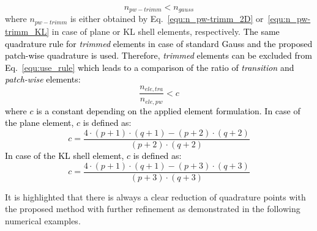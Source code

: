 \documentclass[3p]{elsarticle}
\newcommand{\reviewed}{\textcolor{black}}	%
\begin{document}
\begin{equation}\label{equ:use_rule}
	n_{pw-trimm} < n_{gauss}
\end{equation}
where $n_{pw-trimm}$ is either obtained by Eq.~\eqref{equ:n_pw-trimm_2D} or~\eqref{equ:n_pw-trimm_KL} in case of plane or KL shell elements, respectively. \reviewed{The same quadrature rule for \textit{trimmed} elements in case of standard Gauss and the proposed patch-wise quadrature is used. Therefore, \textit{trimmed} elements can be excluded from Eq.~\eqref{equ:use_rule} which leads to a comparison of the ratio of \textit{transition} and \textit{patch-wise} elements:}
\begin{equation}\label{equ:use_rule_a}
	\dfrac{n_{ele,tra}}{n_{ele,pw}} < c
\end{equation}
\reviewed{where $c$ is a constant depending on the applied element formulation. In case of the plane element, $c$ is defined as:}
\begin{equation}\label{equ:constant_c_plane}
	c = \dfrac{4\cdot(p+1)\cdot(q+1)-(p+2)\cdot(q+2)}{(p+2)\cdot(q+2)}
\end{equation}
\reviewed{In case of the KL shell element, $c$ is defined as:}
\begin{equation}\label{equ:constant_c_KL}
	c = \dfrac{4\cdot(p+1)\cdot(q+1)-(p+3)\cdot(q+3)}{(p+3)\cdot(q+3)}
\end{equation}

It is highlighted that there is always a clear reduction of quadrature points with the proposed method with further refinement as demonstrated in the following numerical examples.
\end{document}
